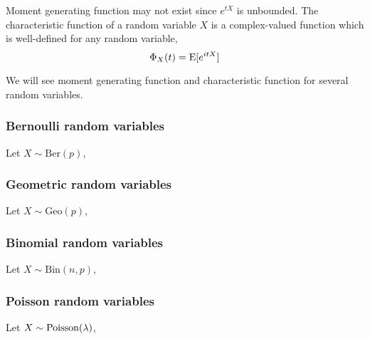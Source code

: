 Moment generating function may not exist since $e^{tX}$ is unbounded. The characteristic function of a random variable $X$ is a complex-valued function which is well-defined for any random variable,
$$\Phi_X(t) = \operatorname{E}[e^{itX}]$$

We will see moment generating function and characteristic function for several random variables.

\subsubsection{Bernoulli random variables}
Let $X\sim \textrm{Ber}(p)$,

\subsubsection{Geometric random variables}
Let $X\sim \textrm{Geo}(p)$,

\subsubsection{Binomial random variables}
Let $X\sim \textrm{Bin}(n,p)$,

\subsubsection{Poisson random variables}
Let $X\sim \mathrm{Poisson}(\lambda)$,

